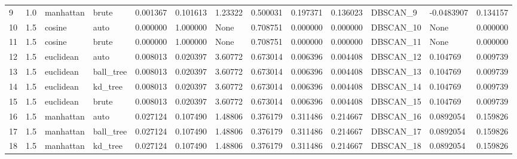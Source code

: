 \begin{tabular}{lrllrrlrrrllr}
9  &  1.0 &  manhattan &      brute &             0.001367 &            0.101613 &              1.23322 &               0.500031 &           0.197371 &           0.136023 &   DBSCAN\_9 &       -0.0483907 &         0.134157 \\
10 &  1.5 &     cosine &       auto &             0.000000 &            1.000000 &                 None &               0.708751 &           0.000000 &           0.000000 &  DBSCAN\_10 &             None &         0.000000 \\
11 &  1.5 &     cosine &      brute &             0.000000 &            1.000000 &                 None &               0.708751 &           0.000000 &           0.000000 &  DBSCAN\_11 &             None &         0.000000 \\
12 &  1.5 &  euclidean &       auto &             0.008013 &            0.020397 &              3.60772 &               0.673014 &           0.006396 &           0.004408 &  DBSCAN\_12 &         0.104769 &         0.009739 \\
13 &  1.5 &  euclidean &  ball\_tree &             0.008013 &            0.020397 &              3.60772 &               0.673014 &           0.006396 &           0.004408 &  DBSCAN\_13 &         0.104769 &         0.009739 \\
14 &  1.5 &  euclidean &    kd\_tree &             0.008013 &            0.020397 &              3.60772 &               0.673014 &           0.006396 &           0.004408 &  DBSCAN\_14 &         0.104769 &         0.009739 \\
15 &  1.5 &  euclidean &      brute &             0.008013 &            0.020397 &              3.60772 &               0.673014 &           0.006396 &           0.004408 &  DBSCAN\_15 &         0.104769 &         0.009739 \\
16 &  1.5 &  manhattan &       auto &             0.027124 &            0.107490 &              1.48806 &               0.376179 &           0.311486 &           0.214667 &  DBSCAN\_16 &        0.0892054 &         0.159826 \\
17 &  1.5 &  manhattan &  ball\_tree &             0.027124 &            0.107490 &              1.48806 &               0.376179 &           0.311486 &           0.214667 &  DBSCAN\_17 &        0.0892054 &         0.159826 \\
18 &  1.5 &  manhattan &    kd\_tree &             0.027124 &            0.107490 &              1.48806 &               0.376179 &           0.311486 &           0.214667 &  DBSCAN\_18 &        0.0892054 &         0.159826 \\

\end{tabular}
